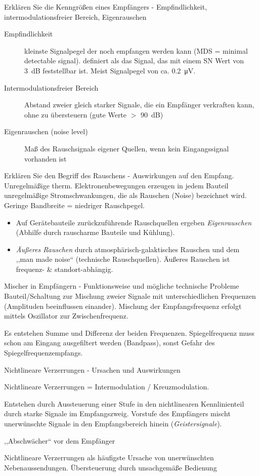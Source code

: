 \documentclass[avery5371,grid,frame,a4paper]{flashcards}
\newcommand{\card}[3]{
  \begin{flashcard}[{\chap} -- #1]{#2}#3\end{flashcard}
}
\begin{document}
\card{39}{Erklären Sie die Kenngrößen eines Empfängers - Empfindlichkeit, intermodulationsfreier Bereich, Eigenrauschen}{
  \small
  \begin{description}
    \item[Empfindlichkeit]
      kleinste Signalpegel der noch empfangen werden kann (MDS = minimal detectable signal).
      definiert als das Signal, das mit einem SN Wert von \SI{3}{\dB} feststellbar ist.
      Meist Signalpegel von ca. \SI{0,2}{\micro\volt}.
    \item[Intermodulationsfreier Bereich]
      Abstand zweier gleich starker Signale, die ein Empfänger verkraften kann, ohne zu übersteuern
      (gute Werte $>$ \SI{90}{\dB})
    \item[Eigenrauschen (noise level)]
      Maß des Rauschsignals eigener Quellen, wenn kein Eingangssignal vorhanden ist
  \end{description}
}
\card{40}{Erklären Sie den Begriff des Rauschens - Auswirkungen auf den Empfang.}{
  \small
  Unregelmäßige therm. Elektronenbewegungen erzeugen in jedem Bauteil unregelmäßige Stromschwankungen, die als Rauschen (Noise) bezeichnet wird. Geringe Bandbreite = niedriger Rauschpegel.

  \begin{itemize} \itemsep0pt
    \item Auf Gerätebauteile zurückzuführende Rauschquellen ergeben \emph{Eigenrauschen} (Abhilfe durch rauscharme Bauteile und Kühlung).
    \item \emph{Äußeres Rauschen} durch atmosphärisch-galaktisches Rauschen und dem ,,man made noise`` (technische Rauschquellen). Äußeres Rauschen ist frequenz- \& standort-abhängig.
  \end{itemize}
}
\card{41}{Mischer in Empfängern - Funktionsweise und mögliche technische Probleme}{
  Bauteil/Schaltung zur Mischung zweier Signale mit unterschiedlichen Frequenzen (Amplituden beeinflussen einander). Mischung der Empfangsfrequenz erfolgt mittels Oszillator zur Zwischenfrequenz.

  Es entstehen Summe und Differenz der beiden Frequenzen.
  Spiegelfrequenz muss schon am Eingang ausgefiltert werden (Bandpass),
  sonst Gefahr des Spiegelfrequenzempfangs.
}
\card{42}{Nichtlineare Verzerrungen - Ursachen und Auswirkungen}{
  \small
  \item
  Nichtlineare Verzerrungen = Intermodulation / Kreuzmodulation.

  \item
  Entstehen durch Aussteuerung einer Stufe in den nichtlinearen Kennlinienteil durch starke Signale im Empfangszweig. Vorstufe des Empfängers mischt unerwünschte Signale in den Empfangsbereich hinein (\emph{Geistersignale}).

  \begin{description}\itemsep0pt
    \item[Abhilfe] ,,Abschwächer`` vor dem Empfänger
    \item[In Sendern]
      Nichtlineare Verzerrungen als häufigste Ursache von unerwünschten Nebenaussendungen.
      Übersteuerung durch unsachgemäße Bedienung
  \end{description}
}
\end{document}

